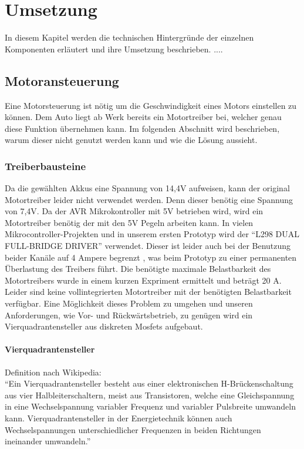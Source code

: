 \chapter{Umsetzung}

In diesem Kapitel werden die technischen Hintergründe der einzelnen Komponenten erläutert und ihre Umsetzung beschrieben.
....


\section{Motoransteuerung}

Eine Motorsteuerung ist nötig um die Geschwindigkeit eines Motors einstellen zu können. Dem Auto liegt ab Werk bereits ein Motortreiber bei,
welcher genau diese Funktion übernehmen kann. Im folgenden Abschnitt wird beschrieben, warum dieser nicht genutzt werden kann und wie die Lösung aussieht.

\subsection{Treiberbausteine}
Da die gewählten Akkus eine Spannung von 14,4V aufweisen, kann der original Motortreiber leider nicht verwendet werden.
Denn dieser benötig eine Spannung von 7,4V. Da der AVR Mikrokontroller mit 5V betrieben wird, wird ein Motortreiber benötig der
mit den 5V Pegeln arbeiten kann. In vielen Mikrocontroller-Projekten und in unserem ersten Prototyp wird der ``L298 DUAL FULL-BRIDGE DRIVER''
verwendet. Dieser ist leider auch bei der Benutzung beider Kanäle auf 4 Ampere begrenzt \cite{L298}, was beim Prototyp zu einer permanenten
Überlastung des Treibers führt. Die benötigte maximale Belastbarkeit des Motortreibers wurde in einem kurzen Expriment ermittelt 
und beträgt 20 A. Leider sind keine vollintegrierten Motortreiber mit der benötigten Belastbarkeit verfügbar. 
Eine Möglichkeit dieses Problem zu umgehen und unseren Anforderungen, wie Vor- und Rückwärtsbetrieb, zu genügen  
wird ein Vierquadrantensteller aus diskreten Mosfets aufgebaut.

\subsubsection{Vierquadrantensteller}
Definition nach Wikipedia\cite{vierquadrantensteller}:\\
``Ein Vierquadrantensteller besteht aus einer elektronischen H-Brückenschaltung aus vier Halbleiterschaltern, meist aus Transistoren, 
welche eine Gleichspannung in eine Wechselspannung variabler Frequenz und variabler Pulsbreite umwandeln kann. Vierquadrantensteller 
in der Energietechnik können auch Wechselspannungen unterschiedlicher Frequenzen in beiden Richtungen ineinander umwandeln.''


